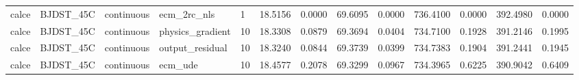 \begin{tabular}{lllllllllllll}
calce & BJDST\_45C & continuous & ecm\_2rc\_nls & 1 & 18.5156 & 0.0000 & 69.6095 & 0.0000 & 736.4100 & 0.0000 & 392.4980 & 0.0000 \\
calce & BJDST\_45C & continuous & physics\_gradient & 10 & 18.3308 & 0.0879 & 69.3694 & 0.0404 & 734.7100 & 0.1928 & 391.2146 & 0.1995 \\
calce & BJDST\_45C & continuous & output\_residual & 10 & 18.3240 & 0.0844 & 69.3739 & 0.0399 & 734.7383 & 0.1904 & 391.2441 & 0.1945 \\
calce & BJDST\_45C & continuous & ecm\_ude & 10 & 18.4577 & 0.2078 & 69.3299 & 0.0967 & 734.3965 & 0.6225 & 390.9042 & 0.6409 \\
\hline
\end{tabular}
